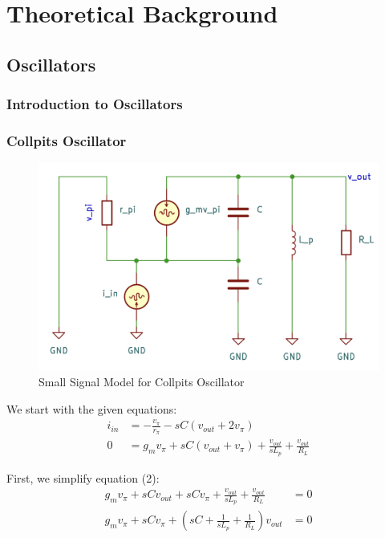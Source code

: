 \section{Theoretical Background}

\subsection{Oscillators}

\subsubsection{Introduction to Oscillators}

\subsubsection{Collpits Oscillator}

\begin{figure}[!h]
    \centering
    \includegraphics[width = 0.7\linewidth]{images/oscillator/design/ssm.png}
    \caption{Small Signal Model for Collpits Oscillator}
    \label{fig:ssm_collpits}
\end{figure}

We start with the given equations:
\begin{align}
    i_{in} &= -\frac{v_{\pi}}{r_{\pi}} - sC(v_{out} + 2v_{\pi}) \tag{1} \\
    0 &= g_mv_{\pi} + sC(v_{out} + v_{\pi}) + \frac{v_{out}}{sL_p} + \frac{v_{out}}{R_L}  \tag{2}
\end{align}

First, we simplify equation (2):
\begin{align*}
    g_mv_{\pi} + sCv_{out} + sCv_{\pi} + \frac{v_{out}}{sL_p} + \frac{v_{out}}{R_L} &= 0 \\
    g_mv_{\pi} + sCv_{\pi} + \left( sC + \frac{1}{sL_p} + \frac{1}{R_L} \right)v_{out} &= 0
\end{align*}

